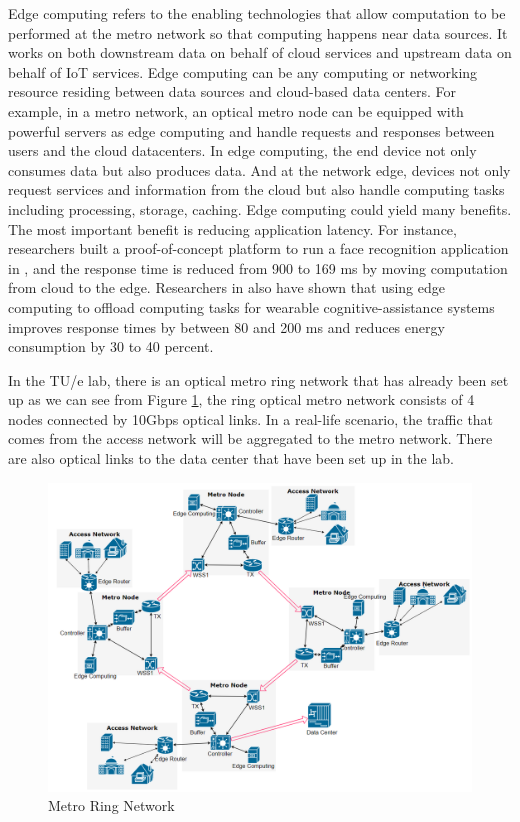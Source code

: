 \documentclass[conference]{IEEEtran}
\begin{document}
Edge computing refers to the enabling technologies that allow computation to be performed at the metro network so that computing happens near data sources. It works on both downstream data on behalf of cloud services and upstream data on behalf of IoT services. Edge computing can be any computing or networking resource residing between data sources and cloud-based data centers. For example, in a metro network, an optical metro node can be equipped with powerful servers as edge computing and handle requests and responses between users and the cloud datacenters. In edge computing, the end device not only consumes data but also produces data. And at the network edge, devices not only request services and information from the cloud but also handle computing tasks including processing, storage, caching. Edge computing could yield many benefits. The most important benefit is reducing application latency. For instance, researchers built a proof-of-concept platform to run a face recognition application in \cite{7372286}, and the response time is reduced from 900 to 169 ms by moving computation from cloud to the edge. Researchers in \cite{5280678} also have shown that using edge computing to offload computing tasks for wearable cognitive-assistance systems improves response times by between 80 and 200 ms and reduces energy consumption by 30 to 40 percent.

In the TU/e lab, there is an optical metro ring network that has already been set up as we can see from Figure \ref{fig:full_metro_ring}, the ring optical metro network consists of 4 nodes connected by 10Gbps optical links. In a real-life scenario, the traffic that comes from the access network will be aggregated to the metro network. There are also optical links to the data center that have been set up in the lab.

\begin{figure}[]
    \centering
        \includegraphics[scale = 0.25]{imgs/metro_ring_with_DC.png}
        \caption{Metro Ring Network}
        \label{fig:full_metro_ring}
    \end{figure}
\end{document}
